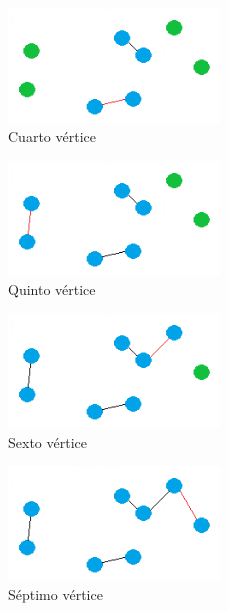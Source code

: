 \vspace{0.5cm}
\begin{figure}[htbH] 
	\centering
	\includegraphics[width=0.5\textwidth]{./Imagenes/arista3.png}
	\caption{Cuarto vértice} 
\end{figure}

\vspace{0.5cm}
\begin{figure}[htbH] 
	\centering
	\includegraphics[width=0.5\textwidth]{./Imagenes/arista4.png}
	\caption{Quinto vértice} 
\end{figure}

\vspace{0.5cm}
\begin{figure}[htbH] 
	\centering
	\includegraphics[width=0.5\textwidth]{./Imagenes/arista5.png}
	\caption{Sexto vértice} 
\end{figure}

\vspace{0.5cm}
\begin{figure}[htbH] 
	\centering
	\includegraphics[width=0.5\textwidth]{./Imagenes/arista6.png}
	\caption{Séptimo vértice} 
\end{figure}


